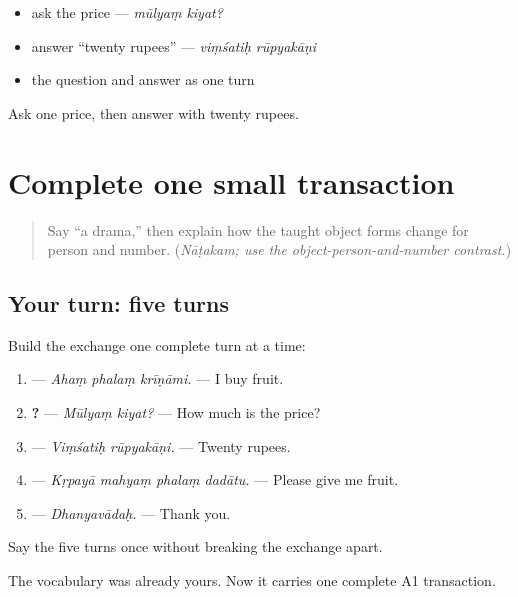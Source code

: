 \begin{itemize}
\raggedright
  \item ask the price — \emph{mūlyaṃ kiyat?}
  \item answer “twenty rupees” — \emph{viṃśatiḥ rūpyakāṇi}
  \item the question and answer as one turn
\end{itemize}

\begin{tcolorbox}[breakable,colback=teal!4,colframe=teal!35!black,title={Before you move on}]
Ask one price, then answer with twenty rupees.
\end{tcolorbox}
\section[Practice]{Complete one small transaction}

\label{lesson:SA-C266-complete-transaction}



\begin{quote}
Say “a drama,” then explain how the taught object forms change for person and number. (\emph{Nāṭakam; use the object-person-and-number contrast.})
\end{quote}

\subsection*{Your turn: five turns}
Build the exchange one complete turn at a time:

\begin{enumerate}
\raggedright
  \item \textbf{  } — \emph{Ahaṃ phalaṃ krīṇāmi.} — I buy fruit.
  \item \textbf{ ?} — \emph{Mūlyaṃ kiyat?} — How much is the price?
  \item \textbf{ } — \emph{Viṃśatiḥ rūpyakāṇi.} — Twenty rupees.
  \item \textbf{   } — \emph{Kṛpayā mahyaṃ phalaṃ dadātu.} — Please give me fruit.
  \item \textbf{} — \emph{Dhanyavādaḥ.} — Thank you.
\end{enumerate}

Say the five turns once without breaking the exchange apart.

\begin{grammarlens}[title={What you've built}]
The vocabulary was already yours. Now it carries one complete A1 transaction.
\end{grammarlens}

